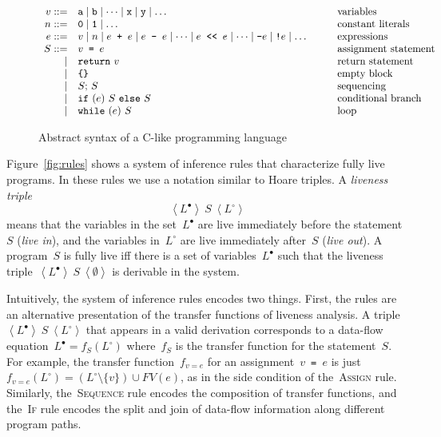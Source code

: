 \documentclass[a4paper]{easychair}
\newcommand{\liveout}[1]{\ensuremath{#1^{\circ}}}
\newcommand{\livein}[1]{\ensuremath{#1^{\bullet}}}
\newcommand{\triple}[3]{\ensuremath{
    \left\langle#1\right\rangle \ #2 \ \left\langle#3\right\rangle
}}
\def\union{\cup}
\begin{document}
\begin{figure}
\[
\begin{array}{rll}
v ::= &
    \mathtt{a} \mid \mathtt{b} \mid \dots \mid \mathtt{x} \mid \mathtt{y}
    \mid \dots &
    \mbox{variables} \\
n ::= & \mathtt{0} \mid \mathtt{1} \mid \dots & \mbox{constant literals} \\
e ::= &
    v \mid
    n \mid
    e \mbox{\texttt{ + }} e \mid e \mbox{\texttt{ - }} e \mid \dots
    \mid e \mbox{\texttt{ <{}< }} e \mid \dots \mid \mbox{\texttt{-}} e \mid
    \mbox{\texttt{!}} e
    \mid \dots \qquad &
    \mbox{expressions} \\
S ::=
    & v \mbox{\texttt{\ =\ }} e & \mbox{assignment statement} \\
\mid & \mathtt{return\ } v & \mbox{return statement} \\
\mid & \mbox{\texttt{\{\}}} & \mbox{empty block} \\ 
\mid & S \mathtt{;\ } S & \mbox{sequencing} \\
\mid & \mathtt{if\ (}e\mathtt{)\ } S \mathtt{\ else\ } S & \mbox{conditional branch} \\
\mid & \mathtt{while\ (}e\mathtt{)\ } S & \mbox{loop}
\end{array}
\]
\caption{Abstract syntax of a C-like programming language}
\label{fig:syntax}
\end{figure}

Figure~\ref{fig:rules} shows a system of inference rules that characterize
fully live programs. In these rules we use a notation similar to Hoare
triples. A \emph{liveness triple} \[\triple{\livein{L}}{S}{\liveout{L}}\]
means that the variables in the set~\(\livein{L}\) are live immediately
before the statement~\(S\) (\emph{live in}), and the variables
in~\(\liveout{L}\) are live immediately after~\(S\) (\emph{live out}). A
program~\(S\) is fully live iff there is a set of variables~\(\livein{L}\)
such that the liveness triple~\(\triple{\livein{L}}{S}{\emptyset}\) is
derivable in the system.


Intuitively, the system of inference rules encodes two things. First, the
rules are an alternative presentation of the transfer functions of liveness
analysis. A triple~\(\triple{\livein{L}}{S}{\liveout{L}}\) that appears in a
valid derivation corresponds to a data-flow equation~\(\livein{L} =
f_S(\liveout{L})\) where~\(f_S\) is the transfer function for the
statement~\(S\). For example, the transfer function~\(f_{v = e}\) for an
assignment~\(v\)\verb| = |\(e\) is just~\(f_{v = e}(\liveout{L}) =
(\liveout{L} \setminus \{v\}) \union FV(e)\), as in the side condition of
the~\textsc{Assign} rule. Similarly, the~\textsc{Sequence} rule encodes the
composition of transfer functions, and the~\textsc{If} rule encodes the
split and join of data-flow information along different program paths.
\end{document}
